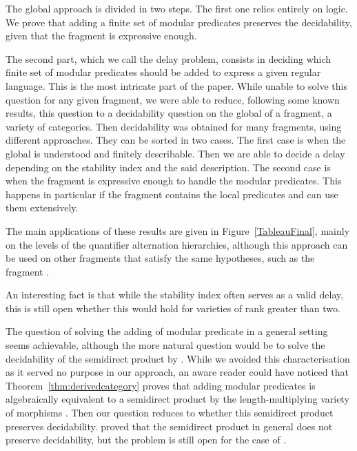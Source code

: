 \documentclass[submission,hidelink]{dmtcs-episciences}
\begin{document}
The global approach is divided in two steps.
The first one relies entirely on logic.
We prove that adding a finite set of modular predicates preserves the decidability, given that the fragment is expressive enough.

The second part, which we call the delay problem, consists in deciding which finite set of modular predicates should be added to express a given regular language.
This is the most intricate part of the paper.
While unable to solve this question for any given fragment, we were able to reduce, following some known results, this question to a decidability question on the global of a fragment, a variety of categories.
Then decidability was obtained for many fragments, using different approaches.
They can be sorted in two cases.
The first case is when the global is understood and finitely describable.
Then we are able to decide a delay depending on the stability index and the said description.
The second case is when the fragment is expressive enough to handle the modular predicates.
This happens in particular if the fragment contains the local predicates and can use them extensively.

The main applications of these results are given in Figure~\ref{TableauFinal}, mainly on the levels of the quantifier alternation hierarchies, although this approach can be used on other fragments that satisfy the same hypotheses, such as the fragment .

An interesting fact is that while the stability index often serves as a valid delay, this is still open whether this would hold for varieties of rank greater than two.

The question of solving the adding of modular predicate in a general setting seems achievable, although the more natural question would be to solve the decidability of the semidirect product by .
While we avoided this characterisation as it served no purpose in our approach, an aware reader could have noticed that Theorem~\ref{thm:derivedcategory}
proves that adding modular predicates is algebraically equivalent to a semidirect product by the length-multiplying variety of morphisms .
Then our question reduces to whether this semidirect product preserves decidability.
\cite{Auinger10} proved that the semidirect product in general does not preserve decidability, but the problem is still open for the case of .



\end{document}
